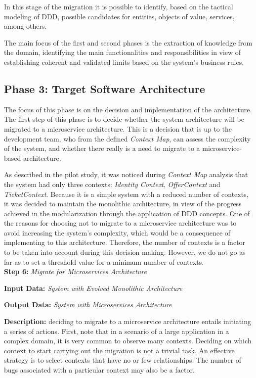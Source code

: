 \documentclass[a4paper,twoside]{article}
\begin{document}
In this stage of the migration it is possible to identify, based on the tactical modeling of DDD, possible candidates for entities, objects of value, services, among others.

The main focus of the first and second phases is the extraction of knowledge from the domain, identifying the main functionalities and responsibilities in view of establishing coherent and validated limits based on the system's business rules.

\subsection{Phase 3: Target Software Architecture}

The focus of this phase is on the decision and implementation of the architecture. The first step of this phase is to decide whether the system architecture will be migrated to a microservice architecture. This is a decision that is up to the development team, who from the defined \textit{Context Map}, can assess the complexity of the system, and whether there really is a need to migrate to a microservice-based architecture.

As described in the pilot study, it was noticed during \textit{Context Map} analysis that the system had only three contexts: \textit{Identity Context}, \textit{OfferContext} and \textit{TicketContext}. Because it is a simple system with a reduced number of contexts, it was decided to maintain the monolithic architecture, in view of the progress achieved in the modularization through the application of DDD concepts. One of the reasons for choosing not to migrate to a microservice architecture was to avoid increasing the system's complexity, which would be a consequence of implementing to this architecture. Therefore, the number of contexts is a factor to be taken into account during this decision making. However, we do not go as far as to set a threshold value for a minimum number of contexts.\\

\noindent
\textbf{Step 6:}
\textit{Migrate for Microservices Architecture}

\textbf{Input Data:}
\textit{System with Evolved Monolithic Architecture}

\textbf{Output Data:}
\textit{System with Microservices Architecture}

\textbf{Description:}
deciding to migrate to a microservice architecture entails initiating a series of actions. First, note that in a scenario of a large application in a complex domain, it is very common to observe many contexts. Deciding on which context to start carrying out the migration is not a trivial task. An effective strategy is to select contexts that have no or few relationships. The number of bugs associated with a particular context may also be a factor.
\end{document}
